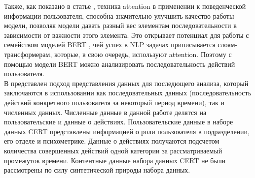 
Также, как показано в статье \cite{yuanAttentionBasedLSTMInsider2019}, техника attention в применении к поведенческой информации пользователя, способна значительно улучшить качество работы модели, позволяя модели давать разный вес элементам последовательности в зависимости от важности этого элемента. Это открывает потенциал для работы с семейством моделей BERT \cite{devlinBERTPretrainingDeep2019}, чей успех в NLP задачах приписывается слоям-трансформерам, которые, в свою очередь, используют attention. Поэтому с помощью модели BERT можно анализировать последовательность действий пользователя.\\

В \cite{leEvaluatingInsiderThreat2018} представлен подход представления данных для последющего анализа, который заключаются в использовании как последовательных данных (последовательность действий конкретного пользователя за некоторый период времени), так и численных данных. Численные данные в данной работе делятся на пользовательские и данные о действиях. Пользовательские данные в наборе данных CERT представлены информацией о роли пользователя в подразделении, его отделе и психометрике. Данные о действиях получаются подсчетом количества совершенных действий одной категории за рассматриваемый промежуток времени. Контентные данные набора данных CERT не были рассмотрены по силу синтетической природы набора данных.

